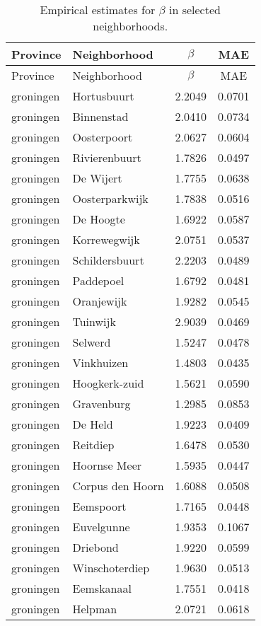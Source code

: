\begin{longtable}{llcc}
\caption{Empirical estimates for $\beta$ in selected neighborhoods.} \label{tab:results}\\
\hline
Province & Neighborhood & $\beta$ & MAE \\
\hline
\endfirsthead
\hline
Province & Neighborhood & $\beta$ & MAE \\
\hline
\endhead
groningen & Hortusbuurt & 2.2049 & 0.0701 \\
groningen & Binnenstad & 2.0410 & 0.0734 \\
groningen & Oosterpoort & 2.0627 & 0.0604 \\
groningen & Rivierenbuurt & 1.7826 & 0.0497 \\
groningen & De Wijert & 1.7755 & 0.0638 \\
groningen & Oosterparkwijk & 1.7838 & 0.0516 \\
groningen & De Hoogte & 1.6922 & 0.0587 \\
groningen & Korrewegwijk & 2.0751 & 0.0537 \\
groningen & Schildersbuurt & 2.2203 & 0.0489 \\
groningen & Paddepoel & 1.6792 & 0.0481 \\
groningen & Oranjewijk & 1.9282 & 0.0545 \\
groningen & Tuinwijk & 2.9039 & 0.0469 \\
groningen & Selwerd & 1.5247 & 0.0478 \\
groningen & Vinkhuizen & 1.4803 & 0.0435 \\
groningen & Hoogkerk-zuid & 1.5621 & 0.0590 \\
groningen & Gravenburg & 1.2985 & 0.0853 \\
groningen & De Held & 1.9223 & 0.0409 \\
groningen & Reitdiep & 1.6478 & 0.0530 \\
groningen & Hoornse Meer & 1.5935 & 0.0447 \\
groningen & Corpus den Hoorn & 1.6088 & 0.0508 \\
groningen & Eemspoort & 1.7165 & 0.0448 \\
groningen & Euvelgunne & 1.9353 & 0.1067 \\
groningen & Driebond & 1.9220 & 0.0599 \\
groningen & Winschoterdiep & 1.9630 & 0.0513 \\
groningen & Eemskanaal & 1.7551 & 0.0418 \\
groningen & Helpman & 2.0721 & 0.0618 \\

\end{longtable}
